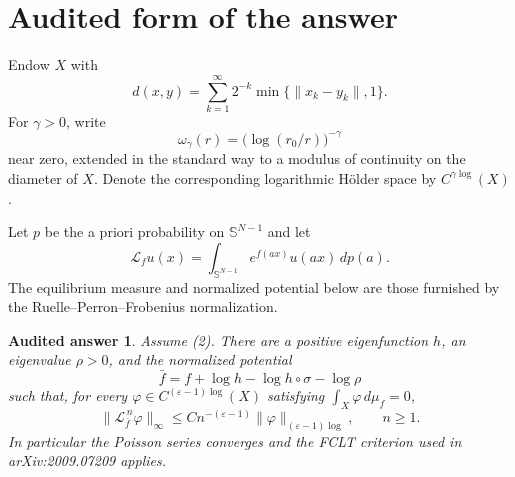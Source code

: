 \documentclass[11pt]{article}
\newtheorem*{theorem}{Audited answer}
\newcommand{\Sph}{\mathbb S}
\newcommand{\cL}{\mathscr L}
\begin{document}
\section*{Audited form of the answer}

Endow \(X\) with
\[
 d(x,y)=\sum_{k=1}^{\infty}2^{-k}
        \min\{\|x_k-y_k\|,1\}.
 \tag{4}
\]
For \(\gamma>0\), write
\[
 \omega_\gamma(r)=\bigl(\log(r_0/r)\bigr)^{-\gamma}
\]
near zero, extended in the standard way to a modulus of continuity on the
diameter of \(X\).  Denote the corresponding logarithmic Hölder space by
\(C^{\gamma\log}(X)\).

Let \(p\) be the a priori probability on \(\Sph^{N-1}\) and let
\[
 \cL_f u(x)=\int_{\Sph^{N-1}}e^{f(ax)}u(ax)\,dp(a).
\]
The equilibrium measure and normalized potential below are those furnished by
the Ruelle--Perron--Frobenius normalization.

\begin{theorem}
Assume (2).  There are a positive eigenfunction \(h\), an eigenvalue \(\rho>0\),
and the normalized potential
\[
 \bar f=f+\log h-\log h\circ\sigma-\log\rho
\]
such that, for every \(\varphi\in C^{(\varepsilon-1)\log}(X)\) satisfying
\(\int_X\varphi\,d\mu_f=0\),
\[
 \|\cL_{\bar f}^{\,n}\varphi\|_\infty
 \le C n^{-(\varepsilon-1)}
       \|\varphi\|_{(\varepsilon-1)\log},\qquad n\ge1.
 \tag{5}
\]
In particular the Poisson series converges and the FCLT criterion used in
arXiv:2009.07209 applies.
\end{theorem}
\end{document}
